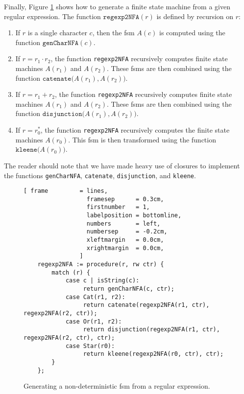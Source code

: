 Finally, Figure \ref{fig:regexp2NFA.stlx} shows how to generate a finite state machine
from a given regular expression.  The function $\texttt{regexp2NFA}(r)$ is defined by
recursion on $r$:
\begin{enumerate}
\item If $r$ is a single character $c$, then the fsm $A(c)$ is computed using
      the function $\texttt{genCharNFA}(c)$.
\item If $r = r_1 \cdot r_2$, the function \texttt{regexp2NFA} recursively computes
      finite state machines $A(r_1)$ and $A(r_2)$.  These fsms are then combined
      using the function $\texttt{catenate}\bigr(A(r_1), A(r_2)\bigr)$.
\item If $r = r_1 + r_2$, the function \texttt{regexp2NFA} recursively computes
      finite state machines $A(r_1)$ and $A(r_2)$.  These fsms are then combined
      using the function $\texttt{disjunction}\bigr(A(r_1), A(r_2)\bigr)$.
\item If $r = r_0^*$, the function \texttt{regexp2NFA} recursively computes
      the finite state machines $A(r_0)$.  This fsm is then transformed
      using the function $\texttt{kleene}\bigr(A(r_0)\bigr)$.
\end{enumerate}
The reader should note that we have made heavy use of closures to implement the functions
\texttt{genCharNFA}, \texttt{catenate}, \texttt{disjunction}, and \texttt{kleene}.

\begin{figure}[!ht]
\centering
\begin{Verbatim}[ frame         = lines, 
                  framesep      = 0.3cm, 
                  firstnumber   = 1,
                  labelposition = bottomline,
                  numbers       = left,
                  numbersep     = -0.2cm,
                  xleftmargin   = 0.0cm,
                  xrightmargin  = 0.0cm,
                ]
    regexp2NFA := procedure(r, rw ctr) {
        match (r) {
            case c | isString(c): 
                 return genCharNFA(c, ctr);
            case Cat(r1, r2):
                 return catenate(regexp2NFA(r1, ctr), regexp2NFA(r2, ctr)); 
            case Or(r1, r2):
                 return disjunction(regexp2NFA(r1, ctr), regexp2NFA(r2, ctr), ctr);
            case Star(r0):
                 return kleene(regexp2NFA(r0, ctr), ctr);
        }
    };
\end{Verbatim}
\vspace*{-0.3cm}
\caption{Generating a non-deterministic fsm from a regular expression.}
\label{fig:regexp2NFA.stlx}
\end{figure}

